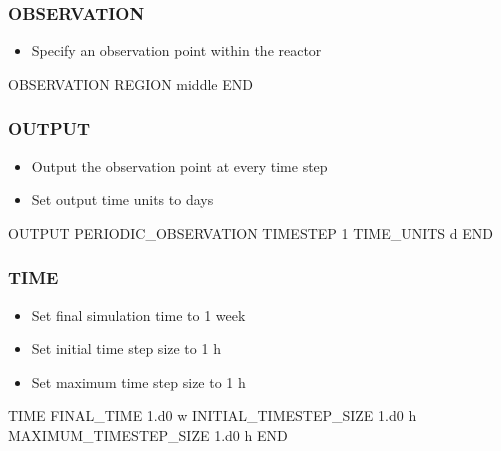 \documentclass{beamer}
\begin{document}
\begin{frame}[fragile]\frametitle{OBSERVATION}

\begin{itemize}
  \item Specify an observation point within the reactor
\end{itemize}

\begin{semiverbatim}


OBSERVATION
  REGION middle
END

\end{semiverbatim}

\end{frame}

\begin{frame}[fragile]\frametitle{OUTPUT}

\begin{itemize}
\item Output the observation point at every time step
\item Set output time units to days
\end{itemize}


\begin{semiverbatim}

OUTPUT
  PERIODIC_OBSERVATION TIMESTEP 1
  TIME_UNITS d
END
\end{semiverbatim}

\end{frame}

\begin{frame}[fragile]\frametitle{TIME}

\begin{itemize}
\item Set final simulation time to 1 week
\item Set initial time step size to 1 h
\item Set maximum time step size to 1 h
\end{itemize}


\begin{semiverbatim}


TIME
  FINAL_TIME 1.d0 w
  INITIAL_TIMESTEP_SIZE 1.d0 h
  MAXIMUM_TIMESTEP_SIZE 1.d0 h
END
\end{semiverbatim}

\end{frame}
\end{document}
